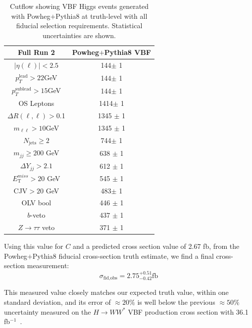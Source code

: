 \begin{table}[!ht]
\centering
\begin{tabular}{c||c}
\textbf{Full Run 2} & \textbf{Powheg$+$Pythia8 VBF} \\
\hline
$|\eta(\ell)|<2.5$ & 144$\pm$ 1 \\
$p_T^{\text{lead}}>22$GeV &144$\pm$ 1 \\
$p_T^{\text{sublead}}>15$GeV & 144$\pm$ 1\\
OS Leptons & 1414$\pm$ 1 \\
$\Delta R(\ell,\ell) >$0.1 & 1345 $\pm$ 1\\
$m_{\ell\ell}>10$GeV & 1345 $\pm$ 1 \\
$N_{\text{jets}}\geq2$ & 744$\pm$ 1\\
$m_{jj} \geq 200$ GeV & 638 $\pm$ 1 \\
$\Delta Y_{jj}>2.1$ & 612 $\pm$ 1 \\
$E_{\text{T}}^{miss}>20$ GeV & 545 $\pm$ 1 \\
CJV$>20$ GeV & 483$\pm$ 1 \\
OLV bool & 446 $\pm$ 1 \\
$b$-veto & 437 $\pm$ 1 \\
$Z\rightarrow\tau\tau$ veto & 371 $\pm$ 1\\
\hline
\end{tabular}
\caption{Cutflow showing VBF Higgs events generated with Powheg$+$Pythia8 at truth-level with all fiducial selection requirements. Statistical uncertainties are shown.}
\label{tab:truth}
\end{table}

Using this value for $C$ and a predicted cross section value of 2.67 fb, from the Powheg$+$Pythia8 fiducial cross-section truth estimate, we find a final cross-section measurement:
\begin{equation}
\sigma_{\text{fid,obs}} = 2.75^{+0.51}_{-0.42} \text{fb} 
\end{equation}

This measured value closely matches our expected truth value, within one standard deviation, and its error of $\approx20\%$ is well below the previous $\approx50\%$ uncertainty measured on the $H\rightarrow WW^*$ VBF production cross section with 36.1 fb$^{-1}$~\cite{Aaboud_2019}. 

